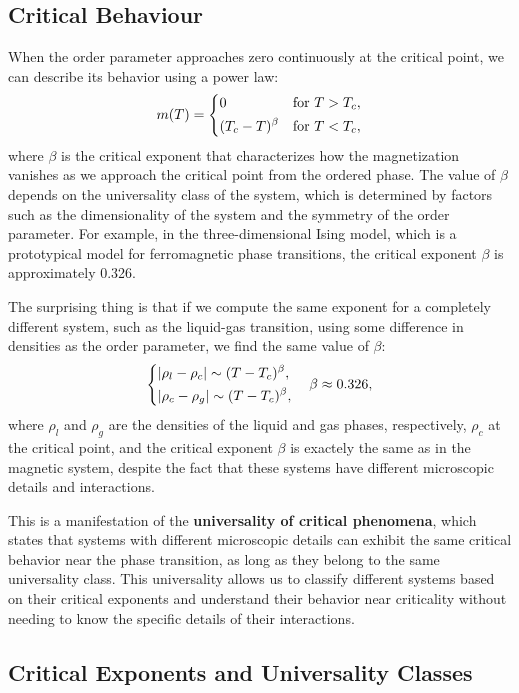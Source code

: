 \subsection{Critical Behaviour}

When the order parameter approaches zero continuously at the critical point, we can describe its behavior using a power law:
\[
    m(T) = \begin{dcases}
        0               & \text{for } T > T_c, \\
        (T_c - T)^\beta & \text{for } T < T_c,
    \end{dcases}
\]
where $\beta$ is the critical exponent that characterizes how the magnetization vanishes as we approach the critical point from the ordered phase. The value of $\beta$ depends on the universality class of the system, which is determined by factors such as the dimensionality of the system and the symmetry of the order parameter. For example, in the three-dimensional Ising model, which is a prototypical model for ferromagnetic phase transitions, the critical exponent $\beta$ is approximately 0.326.

The surprising thing is that if we compute the same exponent for a completely different system, such as the liquid-gas transition, using some difference in densities as the order parameter, we find the same value of $\beta$:
\[
    \begin{dcases}
        \vert \rho_l - \rho_c \vert \sim (T - T_c)^\beta, \\
        \vert \rho_c - \rho_g \vert \sim (T - T_c)^\beta,
    \end{dcases} \quad \beta \approx 0.326,
\]
where $\rho_l$ and $\rho_g$ are the densities of the liquid and gas phases, respectively, \(\rho_c\) at the critical point, and the critical exponent $\beta$ is exactely the same as in the magnetic system, despite the fact that these systems have different microscopic details and interactions.

This is a manifestation of the \textbf{universality of critical phenomena}, which states that systems with different microscopic details can exhibit the same critical behavior near the phase transition, as long as they belong to the same universality class. This universality allows us to classify different systems based on their critical exponents and understand their behavior near criticality without needing to know the specific details of their interactions.

\subsection{Critical Exponents and Universality Classes}

